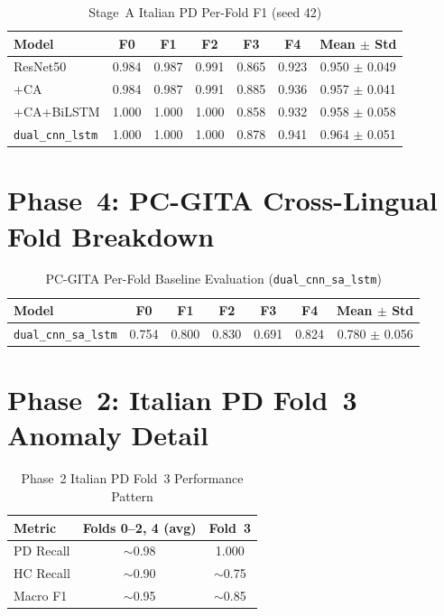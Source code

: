 \documentclass[oneside,openany]{final_report}
\newcommand{\dualcnn}{\texttt{dual\_cnn\_sa\_lstm}}
\begin{document}
\begin{table}[H]
\centering
\caption{Stage~A Italian PD Per-Fold F1 (seed 42)}
\begin{tabular}{l c c c c c c}
\toprule
\textbf{Model} & \textbf{F0} & \textbf{F1} & \textbf{F2} & \textbf{F3} & \textbf{F4} & \textbf{Mean $\pm$ Std} \\
\midrule
ResNet50 & 0.984 & 0.987 & 0.991 & 0.865 & 0.923 & 0.950 $\pm$ 0.049 \\
+CA & 0.984 & 0.987 & 0.991 & 0.885 & 0.936 & 0.957 $\pm$ 0.041 \\
+CA+BiLSTM & 1.000 & 1.000 & 1.000 & 0.858 & 0.932 & 0.958 $\pm$ 0.058 \\
\texttt{dual\_cnn\_lstm} & 1.000 & 1.000 & 1.000 & 0.878 & 0.941 & 0.964 $\pm$ 0.051 \\
\bottomrule
\end{tabular}
\end{table}

\section{Phase~4: PC-GITA Cross-Lingual Fold Breakdown}

\begin{table}[H]
\centering
\caption{PC-GITA Per-Fold Baseline Evaluation (\dualcnn{})}
\begin{tabular}{l c c c c c c}
\toprule
\textbf{Model} & \textbf{F0} & \textbf{F1} & \textbf{F2} & \textbf{F3} & \textbf{F4} & \textbf{Mean $\pm$ Std} \\
\midrule
\dualcnn{} & 0.754 & 0.800 & 0.830 & 0.691 & 0.824 & 0.780 $\pm$ 0.056 \\
\bottomrule
\end{tabular}
\end{table}

\section{Phase~2: Italian PD Fold~3 Anomaly Detail}

\begin{table}[H]
\centering
\caption{Phase~2 Italian PD Fold~3 Performance Pattern}
\begin{tabular}{l c c}
\toprule
\textbf{Metric} & \textbf{Folds 0--2, 4 (avg)} & \textbf{Fold~3} \\
\midrule
PD Recall & $\sim$0.98 & 1.000 \\
HC Recall & $\sim$0.90 & $\sim$0.75 \\
Macro F1 & $\sim$0.95 & $\sim$0.85 \\
\bottomrule
\end{tabular}
\end{table}
\end{document}
